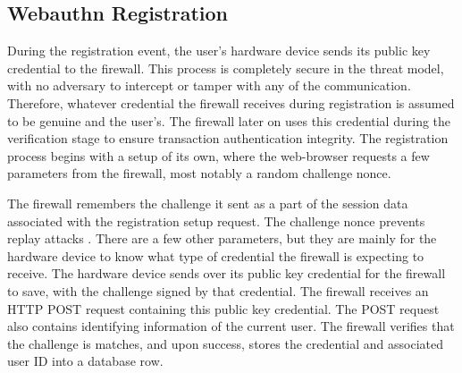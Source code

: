 

\subsection{Webauthn Registration}

During the registration event, the user's hardware device sends its public key credential to the firewall. This process is completely secure in the threat model, with no adversary to intercept or tamper with any of the communication. Therefore, whatever credential the firewall receives during registration is assumed to be genuine and the user's. The firewall later on uses this credential during the verification stage to ensure transaction authentication integrity. The registration process begins with a setup of its own, where the web-browser requests a few parameters from the firewall, most notably a random challenge nonce.



The firewall remembers the challenge it sent as a part of the session data associated with the registration setup request. The challenge nonce prevents replay attacks \cite{TODO-replay-attack}. There are a few other parameters, but they are mainly for the hardware device to know what type of credential the firewall is expecting to receive. The hardware device sends over its public key credential for the firewall to save, with the challenge signed by that credential. The firewall receives an HTTP POST request containing this public key credential. The POST request also contains identifying information of the current user. The firewall verifies that the challenge is matches, and upon success, stores the credential and associated user ID into a database row.


